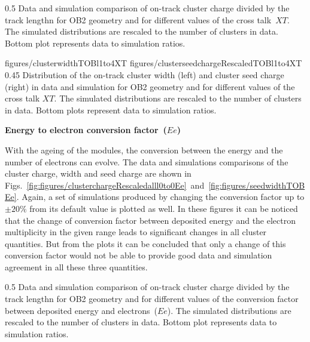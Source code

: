                  {0.5}       %
                 { Data and simulation comparison of on-track cluster charge divided by the track lengthn for OB2 geometry and for different values of the cross talk~$XT$.  The simulated distributions are rescaled to the number of clusters in data.  Bottom plot represents data to simulation ratios. }

                 {figures/clusterwidthTOBl1to4XT}
                 {figures/clusterseedchargeRescaledTOBl1to4XT} %
                 {0.45}       %
                 { Distribution of the on-track cluster width (left) and cluster seed charge (right) in data and simulation for OB2 geometry and for different values of the cross talk $XT$.  The simulated distributions are rescaled to the number of clusters in data.  Bottom plots represent data to simulation ratios. }

\textbf{Energy to electron conversion factor~($Ee$)}

With the ageing of the modules, the conversion between the energy and the number of electrons can evolve. The data and simulations comparisons of the cluster charge, width and seed charge are shown in Figs.~\ref{fig:figures/clusterchargeRescaledalll0to0Ee}~and~\ref{fig:figures/seedwidthTOBEe}. Again, a set of simulations produced by changing the conversion factor up to $\pm 20\%$ from its default value is plotted as well. In these figures it can be noticed that the change of conversion factor between deposited energy and the electron multiplicity in the given range leads to significant changes in all cluster quantities. But from the plots it can be concluded that only a change of this conversion factor would not be able to provide good data and simulation agreement in all these three quantities.

                 {0.5}       %
                 { Data and simulation comparison of on-track cluster charge divided by the track lengthn for OB2 geometry and for different values of the conversion factor between deposited energy and electrons~($Ee$). The simulated distributions are rescaled to the number of clusters in data.  Bottom plot represents data to simulation ratios. }

